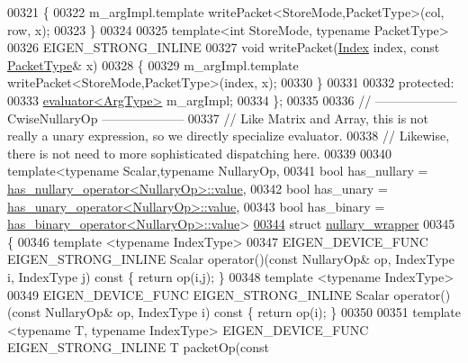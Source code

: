\begin{DoxyCode}
00321   \{
00322     m\_argImpl.template writePacket<StoreMode,PacketType>(col, row, x);
00323   \}
00324 
00325   \textcolor{keyword}{template}<\textcolor{keywordtype}{int} StoreMode, \textcolor{keyword}{typename} PacketType>
00326   EIGEN\_STRONG\_INLINE
00327   \textcolor{keywordtype}{void} writePacket(\hyperlink{namespace_eigen_a62e77e0933482dafde8fe197d9a2cfde}{Index} index, \textcolor{keyword}{const} \hyperlink{struct_eigen_1_1_packet_type}{PacketType}& x)
00328   \{
00329     m\_argImpl.template writePacket<StoreMode,PacketType>(index, x);
00330   \}
00331 
00332 \textcolor{keyword}{protected}:
00333   \hyperlink{struct_eigen_1_1internal_1_1evaluator}{evaluator<ArgType>} m\_argImpl;
00334 \};
00335 
00336 \textcolor{comment}{// -------------------- CwiseNullaryOp --------------------}
00337 \textcolor{comment}{// Like Matrix and Array, this is not really a unary expression, so we directly specialize evaluator.}
00338 \textcolor{comment}{// Likewise, there is not need to more sophisticated dispatching here.}
00339 
00340 \textcolor{keyword}{template}<\textcolor{keyword}{typename} Scalar,\textcolor{keyword}{typename} NullaryOp,
00341          \textcolor{keywordtype}{bool} has\_nullary = \hyperlink{struct_eigen_1_1internal_1_1has__nullary__operator}{has\_nullary\_operator<NullaryOp>::value},
00342          \textcolor{keywordtype}{bool} has\_unary   = \hyperlink{struct_eigen_1_1internal_1_1has__unary__operator}{has\_unary\_operator<NullaryOp>::value},
00343          \textcolor{keywordtype}{bool} has\_binary  = \hyperlink{struct_eigen_1_1internal_1_1has__binary__operator}{has\_binary\_operator<NullaryOp>::value}>
\hyperlink{struct_eigen_1_1internal_1_1nullary__wrapper}{00344} \textcolor{keyword}{struct }\hyperlink{struct_eigen_1_1internal_1_1nullary__wrapper}{nullary\_wrapper}
00345 \{
00346   \textcolor{keyword}{template} <\textcolor{keyword}{typename} IndexType>
00347   EIGEN\_DEVICE\_FUNC EIGEN\_STRONG\_INLINE Scalar operator()(\textcolor{keyword}{const} NullaryOp& op, IndexType i, IndexType j)\textcolor{keyword}{
       const }\{ \textcolor{keywordflow}{return} op(i,j); \}
00348   \textcolor{keyword}{template} <\textcolor{keyword}{typename} IndexType>
00349   EIGEN\_DEVICE\_FUNC EIGEN\_STRONG\_INLINE Scalar operator()(\textcolor{keyword}{const} NullaryOp& op, IndexType i)\textcolor{keyword}{ const }\{ \textcolor{keywordflow}{return} 
      op(i); \}
00350 
00351   \textcolor{keyword}{template} <\textcolor{keyword}{typename} T, \textcolor{keyword}{typename} IndexType> EIGEN\_DEVICE\_FUNC EIGEN\_STRONG\_INLINE T packetOp(\textcolor{keyword}{const} 

\end{DoxyCode}
